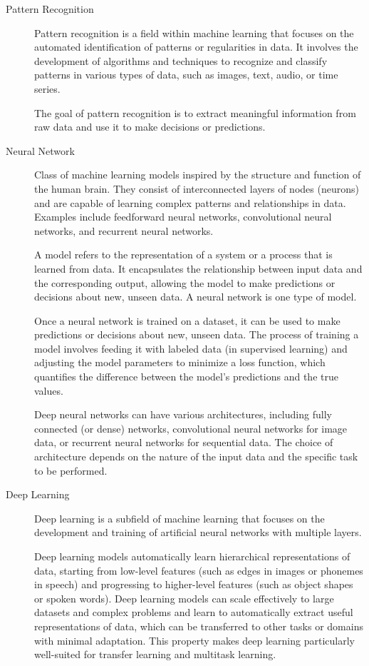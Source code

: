 \documentclass[a4paper]{article}
\begin{document}
\begin{description}
\item[Pattern Recognition]
Pattern recognition is a field within machine learning that focuses on the automated identification of patterns or regularities in data. It involves the development of algorithms and techniques to recognize and classify patterns in various types of data, such as images, text, audio, or time series.

The goal of pattern recognition is to extract meaningful information from raw data and use it to make decisions or predictions.

\item[Neural Network]
Class of machine learning models inspired by the structure and function of the human brain. They consist of interconnected layers of nodes (neurons) and are capable of learning complex patterns and relationships in data. Examples include feedforward neural networks, convolutional neural networks, and recurrent neural networks.

A model refers to the representation of a system or a process that is learned from data. It encapsulates the relationship between input data and the corresponding output, allowing the model to make predictions or decisions about new, unseen data. A neural network is one type of model.

Once a neural network is trained on a dataset, it can be used to make predictions or decisions about new, unseen data. The process of training a model involves feeding it with labeled data (in supervised learning) and adjusting the model parameters to minimize a loss function, which quantifies the difference between the model's predictions and the true values. 

Deep neural networks can have various architectures, including fully connected (or dense) networks, convolutional neural networks for image data, or recurrent neural networks for sequential data. The choice of architecture depends on the nature of the input data and the specific task to be performed.

\item[Deep Learning] 
Deep learning is a subfield of machine learning that focuses on the development and training of artificial neural networks with multiple layers. 

Deep learning models automatically learn hierarchical representations of data, starting from low-level features (such as edges in images or phonemes in speech) and progressing to higher-level features (such as object shapes or spoken words). Deep learning models can scale effectively to large datasets and complex problems and learn to automatically extract useful representations of data, which can be transferred to other tasks or domains with minimal adaptation. This property makes deep learning particularly well-suited for transfer learning and multitask learning.


\end{description}
\end{document}
